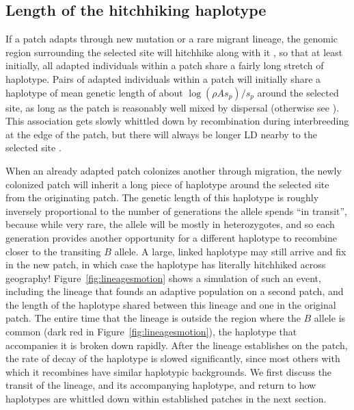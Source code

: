 \documentclass{article}
\newcommand{\citep}[1]{\cite{#1}}
\newcommand{\citet}[1]{\cite{#1}}
\begin{document}
\subsection[Haplotypes Shared Between Patches]{Length of the hitchhiking haplotype}
\label{ss:haplotype_length}


If a patch adapts through new mutation or a rare migrant lineage, the
genomic region surrounding the selected site will hitchhike along with it \citep{maynardsmith1974hitchhiking},
so that at least initially, all adapted individuals within a patch
share a fairly long stretch of haplotype. 
Pairs of adapted individuals within a patch will initially share a haplotype of mean genetic length of
about $\log(\rho A s_p)/s_p$ around the selected site, 
as long as the patch is reasonably well mixed by dispersal
(otherwise see \citet{barton2013genetic}).
This association gets slowly whittled down by recombination during interbreeding at the edge of the patch,
but there will always be longer LD nearby to the selected site \citep{barton1979geneflow}.

When an already adapted patch colonizes another through migration,
 the newly colonized patch will inherit a long piece of haplotype around the selected site from the originating patch.
The genetic length of this haplotype is roughly inversely proportional to the
number of generations the allele spends ``in transit'', 
because while very rare, the allele will be mostly in heterozygotes,
and so each generation provides another opportunity for a different haplotype to recombine closer to the transiting $B$ allele.
A large, linked haplotype may still arrive and fix in the new patch,
in which case the haplotype has literally hitchhiked across geography!
Figure~\ref{fig:lineagesmotion} shows a simulation of such an event,
including the lineage that founds an adaptive population on a second patch,
and the length of the haplotype shared between this lineage and one in the original patch.
The entire time that the lineage is outside the region where the $B$ allele is common (dark red in Figure~\ref{fig:lineagesmotion}), 
the haplotype that accompanies it is broken down rapidly. 
After the lineage establishes on the patch, the rate of decay of the haplotype is slowed significantly, 
since most others with which it recombines have similar haplotypic backgrounds. 
We first discuss the transit of the lineage, and its accompanying haplotype, and return
to how haplotypes are whittled down within established patches in the next section.
\end{document}

